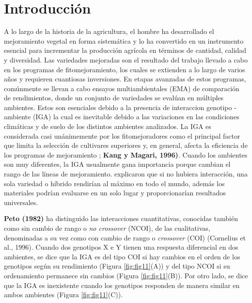 

\chapter{Introducción}

A lo largo de la historia de la agricultura, el hombre ha desarrollado el mejoramiento vegetal en forma sistemática y lo ha convertido en un instrumento esencial para incrementar la producción agrícola en términos de cantidad, calidad y diversidad. Las variedades mejoradas son el resultado del trabajo llevado a cabo en los programas de fitomejoramiento, los cuales se extienden a lo largo de varios años y requieren cuantiosas inversiones. En etapas avanzadas de estos programas, comúnmente se llevan a cabo ensayos multiambientales (EMA) de comparación de rendimientos, donde un conjunto de variedades se evalúan en múltiples ambientes. Estos son esenciales debido a la presencia de interaccion genotipo - ambiente (IGA) la cual es inevitable debido a las variaciones en las condiciones climáticas y de suelo de los distintos ambientes analizados. La IGA es considerada casi unánimemente por los fitomejoradores como el principal factor que limita la selección de cultivares superiores y, en general, afecta la eficiencia de los programas de mejoramiento \citep{Crossaetal1990, CruzMedina1992}; \textbf{Kang y Magari, 1996)}. Cuando los ambientes son muy diferentes, la IGA usualmente gana importancia porque cambian el rango de las líneas de mejoramiento. \citet{GauchZobel1997} explicaron que si no hubiera interacción, una sola variedad o híbrido rendirían al máximo en todo el mundo, además los materiales podrían evaluarse en un solo lugar y proporcionarían resultados universales.


\textbf{Peto (1982)} ha distinguido las interacciones cuantitativas, conocidas también como sin cambio de rango o \emph{no crossover} (NCOI), de las cualitativas, denominadas a su vez como con
cambio de rango o \emph{crossover} (COI) (Cornelius et al., 1996). Cuando dos genotipos X e Y tienen una respuesta diferencial en dos ambientes, se dice que la IGA es del tipo COI si hay cambios en el orden de los genotipos según su rendimiento (Figura \ref{fig:fig11}(A)) y del tipo NCOI si su ordenamiento permanece sin cambios (Figura  \ref{fig:fig11}(B)). Por otro lado, se dice que la IGA es inexistente cuando los genotipos responden de manera similar en ambos ambientes (Figura \ref{fig:fig11}(C)). 


